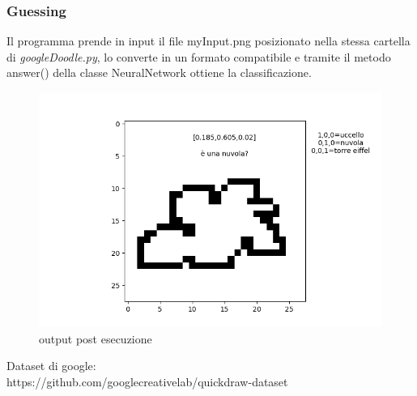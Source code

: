 \documentclass[12pt]{article}
\begin{document}
\subsubsection{Guessing}
Il programma prende in input il file myInput.png posizionato nella stessa cartella di \textit{googleDoodle.py}, lo converte in un formato compatibile e tramite il metodo answer() della classe NeuralNetwork ottiene la classificazione.
\begin{figure}[h!]
	\centering
	\includegraphics[width=15 cm]{output.png}
	\caption{output post esecuzione}
	\label{fig:procOutput}
\end{figure}
\newpage
\begin{thebibliography}{9}
Dataset di google:\\
https://github.com/googlecreativelab/quickdraw-dataset 
\end{thebibliography}
\end{document}
